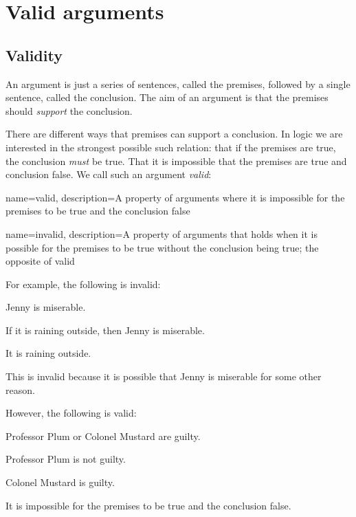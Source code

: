 \chapter{Valid arguments}
\label{s:Valid}

\section{Validity}

An argument is just a series of sentences, called the premises, followed by a single sentence, called the conclusion.
The aim of an argument is that the premises should \emph{support} the conclusion. 

There are different ways that premises can support a conclusion. In logic we are interested in the strongest possible such relation: that if the premises are true, the conclusion \emph{must} be true. That it is impossible that the premises are true and conclusion false. We call such an argument \emph{valid}:


{
name=valid,
description={A property of arguments where it is impossible for the premises to be true and the conclusion false}
}

{
name=invalid,
description={A property of arguments that holds when it is possible for the premises to be true without the conclusion being true; the opposite of \gls{valid}}
}

For example, the following is invalid:
	\begin{earg}
		\item[] Jenny is miserable.
		\item[] If it is raining outside, then Jenny is miserable.
		\item[\therefore] It is raining outside.
	\end{earg}
This is invalid because it is possible that Jenny is miserable for some other reason. 

However, the following is valid:
\begin{earg}
	\item[] Professor Plum or Colonel Mustard are guilty. 
	\item[] Professor Plum is not guilty.
	\item[\therefore] Colonel Mustard is guilty. 
\end{earg}
It is impossible for the premises to be true and the conclusion false. 

